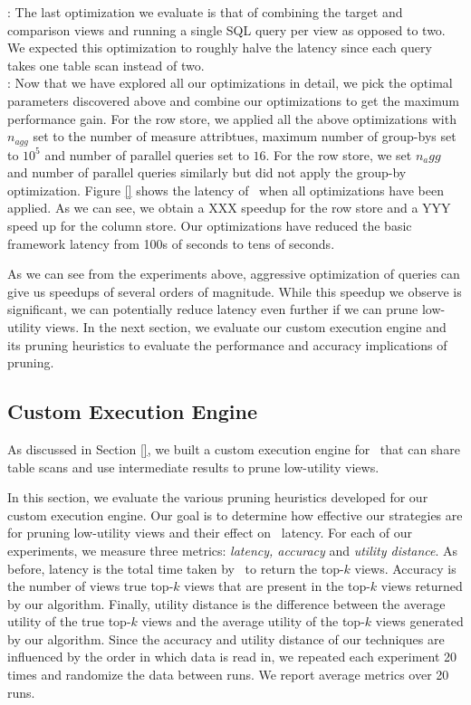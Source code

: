 :
The last optimization we evaluate is that of combining the target and comparison
views and running a single SQL query per view as opposed to two.
We expected this optimization to roughly halve the latency since each query
takes one table scan instead of two.\\

:
Now that we have explored all our optimizations in detail, we pick the optimal
parameters discovered above and combine our optimizations to get the maximum
performance gain.
For the row store, we applied all the above optimizations with $n_{agg}$ set to
the number of measure attribtues, maximum number of group-bys set to $10^5$ and
number of parallel queries set to $16$.
For the row store, we set $n_a{gg}$ and number of parallel queries similarly but
did not apply the group-by optimization. 
Figure \ref{} shows the latency of
\VizRecDB\ when all optimizations have been applied.
As we can see, we obtain a XXX speedup for the row store and a YYY speed up for
the column store.
Our optimizations have reduced the basic framework latency from 100s of seconds
to tens of seconds.

As we can see from the experiments above, aggressive optimization of queries can
give us speedups of several orders of magnitude.
While this speedup we observe is significant, we can potentially reduce latency
even further if we can prune low-utility views.
In the next section, we evaluate our custom execution engine and its pruning
heuristics to evaluate the performance and accuracy implications of pruning.

\subsection{Custom Execution Engine}
\label{sec:custom_execution_engine}

As discussed in Section \ref{}, we built a custom execution engine for
\VizRecDB\ that can share table scans and use intermediate
results to prune low-utility views.  

In this section, we evaluate the various pruning heuristics developed for our
custom execution engine.
Our goal is to determine how effective our strategies are for pruning
low-utility views and their effect on \VizRecDB\ latency.
For each of our experiments, we measure three metrics: {\it latency, accuracy}
and {\it utility distance}.
As before, latency is the total time taken by \VizRecDB\ to return the top-$k$
views.
Accuracy is the number of views true top-$k$ views that are present in the
top-$k$ views returned by our algorithm.
Finally, utility distance is the difference between the average utility of
the true top-$k$ views and the average utility of the top-$k$ views generated by
our algorithm.
Since the accuracy and utility distance of our techniques are influenced by the
order in which data is read in, we repeated each experiment 20
times and randomize the data between runs. We report average
metrics over 20 runs.

